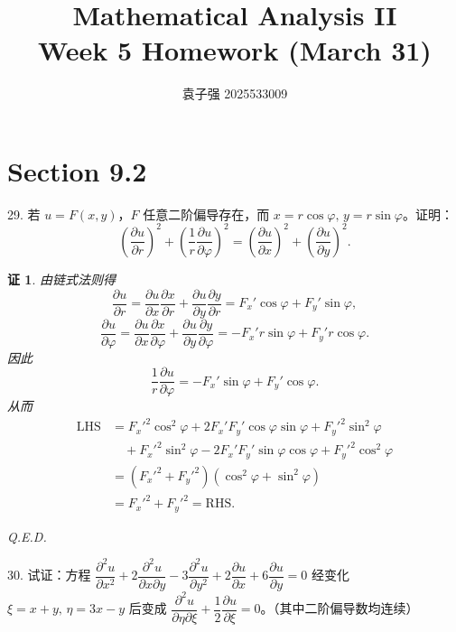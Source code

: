 \documentclass[a4paper,12pt]{article}
\title{Mathematical Analysis II\\Week 5 Homework (March 31)}
\author{袁子强\hspace{1cm} 2025533009}
\newtheorem*{pf}{证}
\begin{document}
\maketitle

\section*{Section 9.2}

29. 若 $u = F(x,y)$，$F$ 任意二阶偏导存在，而 $x = r\cos\varphi,\,y = r\sin\varphi$。证明：
$$
    \left(\frac{\partial u}{\partial r}\right)^2 + \left(\frac{1}{r}\frac{\partial u}{\partial \varphi}\right)^2 = \left(\frac{\partial u}{\partial x}\right)^2 + \left(\frac{\partial u}{\partial y}\right)^2.
$$

\begin{pf}
    由链式法则得
    $$
        \frac{\partial u}{\partial r}=\frac{\partial u}{\partial x}\frac{\partial x}{\partial r}+\frac{\partial u}{\partial y}\frac{\partial y}{\partial r}=F_x'\cos\varphi+F_y'\sin\varphi,
    $$
    $$
        \frac{\partial u}{\partial \varphi}=\frac{\partial u}{\partial x}\frac{\partial x}{\partial \varphi}+\frac{\partial u}{\partial y}\frac{\partial y}{\partial \varphi}=-F_x'r\sin\varphi+F_y'r\cos\varphi.
    $$
    因此
    $$
        \frac{1}{r}\frac{\partial u}{\partial \varphi}=-F_x'\sin\varphi+F_y'\cos\varphi.
    $$
    从而
    $$
        \begin{aligned}
            \text{LHS} & =F_x'^2\cos^2\varphi+2F_x'F_y'\cos\varphi\sin\varphi+F_y'^2\sin^2\varphi       \\
                       & \quad +F_x'^2\sin^2\varphi-2F_x'F_y'\sin\varphi\cos\varphi+F_y'^2\cos^2\varphi \\
                       & =(F_x'^2+F_y'^2)(\cos^2\varphi+\sin^2\varphi)                                  \\
                       & =F_x'^2+F_y'^2=\text{RHS}.
        \end{aligned}
    $$

    Q.E.D.
\end{pf}

30. 试证：方程 $\dfrac{\partial^2 u}{\partial x^2} + 2\dfrac{\partial^2 u}{\partial x\partial y} - 3\dfrac{\partial^2 u}{\partial y^2} + 2\dfrac{\partial u}{\partial x} + 6\dfrac{\partial u}{\partial y} = 0$ 经变化 $\xi = x + y,\,\eta = 3x - y$ 后变成 $\dfrac{\partial^2 u}{\partial \eta\partial \xi} + \dfrac{1}{2}\dfrac{\partial u}{\partial \xi} = 0$。（其中二阶偏导数均连续）
\end{document}

